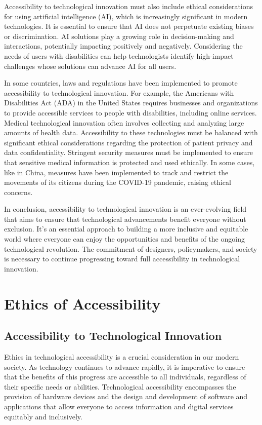 Accessibility to technological innovation must also include ethical considerations for using artificial intelligence (AI), which is increasingly significant in modern technologies. It is essential to ensure that AI does not perpetuate existing biases or discrimination. AI solutions play a growing role in decision-making and interactions, potentially impacting positively and negatively. Considering the needs of users with disabilities can help technologists identify high-impact challenges whose solutions can advance AI for all users\cite{morris_ai_2020}.

In some countries, laws and regulations have been implemented to promote accessibility to technological innovation. For example, the Americans with Disabilities Act (ADA) in the United States requires businesses and organizations to provide accessible services to people with disabilities, including online services. Medical technological innovation often involves collecting and analyzing large amounts of health data. Accessibility to these technologies must be balanced with significant ethical considerations regarding the protection of patient privacy and data confidentiality. Stringent security measures must be implemented to ensure that sensitive medical information is protected and used ethically\cite{noauthor_comment_2020}. In some cases, like in China, measures have been implemented to track and restrict the movements of its citizens during the COVID-19 pandemic, raising ethical concerns\cite{noauthor_complicated_nodate}.

In conclusion, accessibility to technological innovation is an ever-evolving field that aims to ensure that technological advancements benefit everyone without exclusion. It’s an essential approach to building a more inclusive and equitable world where everyone can enjoy the opportunities and benefits of the ongoing technological revolution. The commitment of designers, policymakers, and society is necessary to continue progressing toward full accessibility in technological innovation.

\section{Ethics of Accessibility}
\subsection{Accessibility to Technological Innovation}

Ethics in technological accessibility is a crucial consideration in our modern society. As technology continues to advance rapidly, it is imperative to ensure that the benefits of this progress are accessible to all individuals, regardless of their specific needs or abilities. Technological accessibility encompasses the provision of hardware devices and the design and development of software and applications that allow everyone to access information and digital services equitably and inclusively.

